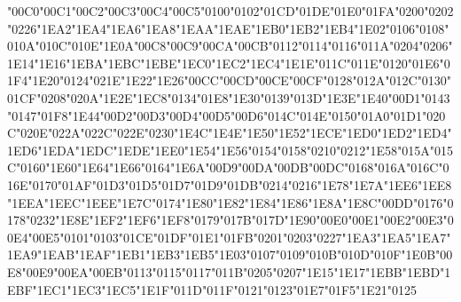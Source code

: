 {\LibertinusSerifPatch
	\char"00C0\gs \char"00C1\gs \char"00C2\gs \char"00C3\gs \char"00C4\gs \char"00C5\gs \char"0100\gs \char"0102\gs \char"01CD\gs \char"01DE\gs \char"01E0\gs \char"01FA\gs \char"0200\gs \char"0202\gs \char"0226\gs \char"1EA2\gs \char"1EA4\gs \char"1EA6\gs \char"1EA8\gs \char"1EAA\gs \char"1EAE\gs \char"1EB0\gs \char"1EB2\gs \char"1EB4\gs \char"1E02\gs \char"0106\gs \char"0108\gs \char"010A\gs \char"010C\gs \char"010E\gs \char"1E0A\gs \char"00C8\gs \char"00C9\gs \char"00CA\gs \char"00CB\gs \char"0112\gs \char"0114\gs \char"0116\gs \char"011A\gs \char"0204\gs \char"0206\gs \char"1E14\gs \char"1E16\gs \char"1EBA\gs \char"1EBC\gs \char"1EBE\gs \char"1EC0\gs \char"1EC2\gs \char"1EC4\gs \char"1E1E\gs \char"011C\gs \char"011E\gs \char"0120\gs \char"01E6\gs \char"01F4\gs \char"1E20\gs \char"0124\gs \char"021E\gs \char"1E22\gs \char"1E26\gs \char"00CC\gs \char"00CD\gs \char"00CE\gs \char"00CF\gs \char"0128\gs \char"012A\gs \char"012C\gs \char"0130\gs \char"01CF\gs \char"0208\gs \char"020A\gs \char"1E2E\gs \char"1EC8\gs \char"0134\gs \char"01E8\gs \char"1E30\gs \char"0139\gs \char"013D\gs \char"1E3E\gs \char"1E40\gs \char"00D1\gs \char"0143\gs \char"0147\gs \char"01F8\gs \char"1E44\gs \char"00D2\gs \char"00D3\gs \char"00D4\gs \char"00D5\gs \char"00D6\gs \char"014C\gs \char"014E\gs \char"0150\gs \char"01A0\gs \char"01D1\gs \char"020C\gs \char"020E\gs \char"022A\gs \char"022C\gs \char"022E\gs \char"0230\gs \char"1E4C\gs \char"1E4E\gs \char"1E50\gs \char"1E52\gs \char"1ECE\gs \char"1ED0\gs \char"1ED2\gs \char"1ED4\gs \char"1ED6\gs \char"1EDA\gs \char"1EDC\gs \char"1EDE\gs \char"1EE0\gs \char"1E54\gs \char"1E56\gs \char"0154\gs \char"0158\gs \char"0210\gs \char"0212\gs \char"1E58\gs \char"015A\gs \char"015C\gs \char"0160\gs \char"1E60\gs \char"1E64\gs \char"1E66\gs \char"0164\gs \char"1E6A\gs \char"00D9\gs \char"00DA\gs \char"00DB\gs \char"00DC\gs \char"0168\gs \char"016A\gs \char"016C\gs \char"016E\gs \char"0170\gs \char"01AF\gs \char"01D3\gs \char"01D5\gs \char"01D7\gs \char"01D9\gs \char"01DB\gs \char"0214\gs \char"0216\gs \char"1E78\gs \char"1E7A\gs \char"1EE6\gs \char"1EE8\gs \char"1EEA\gs \char"1EEC\gs \char"1EEE\gs \char"1E7C\gs \char"0174\gs \char"1E80\gs \char"1E82\gs \char"1E84\gs \char"1E86\gs \char"1E8A\gs \char"1E8C\gs \char"00DD\gs \char"0176\gs \char"0178\gs \char"0232\gs \char"1E8E\gs \char"1EF2\gs \char"1EF6\gs \char"1EF8\gs \char"0179\gs \char"017B\gs \char"017D\gs \char"1E90\gs \char"00E0\gs \char"00E1\gs \char"00E2\gs \char"00E3\gs \char"00E4\gs \char"00E5\gs \char"0101\gs \char"0103\gs \char"01CE\gs \char"01DF\gs \char"01E1\gs \char"01FB\gs \char"0201\gs \char"0203\gs \char"0227\gs \char"1EA3\gs \char"1EA5\gs \char"1EA7\gs \char"1EA9\gs \char"1EAB\gs \char"1EAF\gs \char"1EB1\gs \char"1EB3\gs \char"1EB5\gs \char"1E03\gs \char"0107\gs \char"0109\gs \char"010B\gs \char"010D\gs \char"010F\gs \char"1E0B\gs \char"00E8\gs \char"00E9\gs \char"00EA\gs \char"00EB\gs \char"0113\gs \char"0115\gs \char"0117\gs \char"011B\gs \char"0205\gs \char"0207\gs \char"1E15\gs \char"1E17\gs \char"1EBB\gs \char"1EBD\gs \char"1EBF\gs \char"1EC1\gs \char"1EC3\gs \char"1EC5\gs \char"1E1F\gs \char"011D\gs \char"011F\gs \char"0121\gs \char"0123\gs \char"01E7\gs \char"01F5\gs \char"1E21\gs \char"0125\gs }
